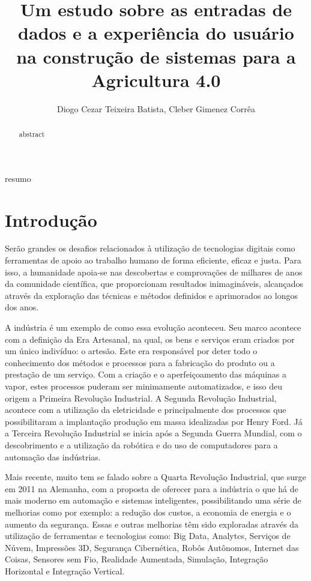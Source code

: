\documentclass[12pt]{article}
\title{Um estudo sobre as entradas de dados e a experiência do usuário na construção de sistemas para a Agricultura 4.0}
\author{Diogo Cezar Teixeira Batista\inst{1}, Cleber Gimenez Corrêa\inst{1}}
\begin{document}
 

\maketitle

\begin{abstract}
  abstract
\end{abstract}
     
\begin{resumo} 
  resumo
\end{resumo}


\section{Introdução}

Serão grandes os desafios relacionados à utilização de tecnologias digitais como ferramentas de apoio ao trabalho humano de forma eficiente, eficaz e justa. Para isso, a humanidade apoia-se nas descobertas e comprovações de milhares de anos da comunidade científica, que proporcionam resultados inimagináveis, alcançados através da exploração das técnicas e métodos definidos e aprimorados ao longos dos anos.

A indústria é um exemplo de como essa evolução aconteceu. Seu marco acontece com a definição da Era Artesanal, na qual, os bens e serviços eram criados por um único indivíduo: o artesão. Este era responsável por deter todo o conhecimento dos métodos e processos para a fabricação do produto ou a prestação de um serviço. Com a criação e o aperfeiçoamento das máquinas a vapor, estes processos puderam ser minimamente automatizados, e isso deu origem a Primeira Revolução Industrial. A Segunda Revolução Industrial, acontece com a utilização da eletricidade e principalmente dos processos que possibilitaram a implantação produção em massa idealizadas por Henry Ford. Já a Terceira Revolução Industrial se inicia após a Segunda Guerra Mundial, com o descobrimento e a utilização da robótica e do uso de computadores para a automação das indústrias.

Mais recente, muito tem se falado sobre a Quarta Revolução Industrial, que surge em 2011 na Alemanha, com a proposta de oferecer para a indústria o que há de mais moderno em automação e sistemas inteligentes, possibilitando uma série de melhorias como por exemplo: a redução dos custos, a economia de energia e o aumento da segurança. Essas e outras melhorias têm sido exploradas através da utilização de ferramentas e tecnologias como: Big Data, Analytcs, Serviços de Núvem, Impressões 3D, Segurança Cibernética, Robôs Autônomos, Internet das Coisas, Sensores sem Fio, Realidade Aumentada, Simulação, Integração Horizontal e Integração Vertical.
\end{document}
